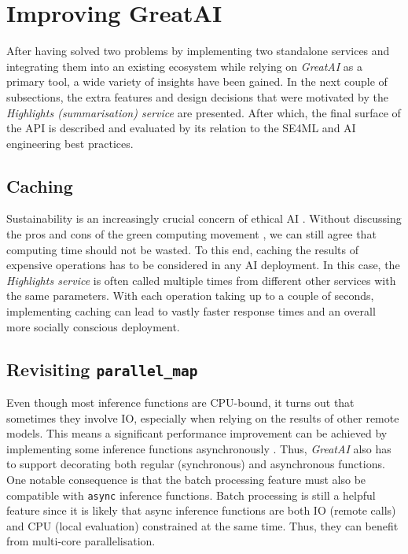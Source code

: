 \section{Improving GreatAI}

After having solved two problems by implementing two standalone services and integrating them into an existing ecosystem while relying on \textit{GreatAI} as a primary tool, a wide variety of insights have been gained. In the next couple of subsections, the extra features and design decisions that were motivated by the \textit{Highlights (summarisation) service} are presented. After which, the final surface of the API is described and evaluated by its relation to the SE4ML \cite{serban2020adoption,serban2021practices} and AI engineering \cite{john2020architecting,john2020ai} best practices.

\subsection{Caching}

Sustainability is an increasingly crucial concern of ethical AI \cite{van2021sustainable}. Without discussing the pros and cons of the green computing movement \cite{10.1145/1400181.1400186}, we can still agree that computing time should not be wasted. To this end, caching the results of expensive operations has to be considered in any AI deployment. In this case, the \textit{Highlights service} is often called multiple times from different other services with the same parameters. With each operation taking up to a couple of seconds, implementing caching can lead to vastly faster response times and an overall more socially conscious deployment.

\subsection{Revisiting \texttt{parallel\_map}}

Even though most inference functions are CPU-bound, it turns out that sometimes they involve IO, especially when relying on the results of other remote models. This means a significant performance improvement can be achieved by implementing some inference functions asynchronously \cite{tilkov2010node}. Thus, \textit{GreatAI} also has to support decorating both regular (synchronous) and asynchronous functions. One notable consequence is that the batch processing feature must also be compatible with \texttt{async} inference functions. Batch processing is still a helpful feature since it is likely that async inference functions are both IO (remote calls) and CPU (local evaluation) constrained at the same time. Thus, they can benefit from multi-core parallelisation. 

